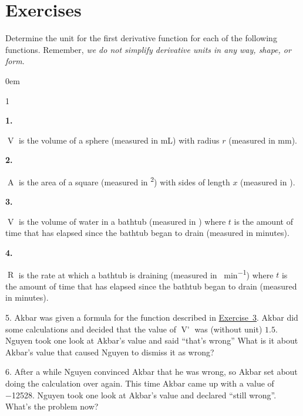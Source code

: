 \documentclass[12pt,]{book}
\theoremstyle{plain}
\theoremstyle{definition}
\numberwithin{equation}{section}
\newenvironment{exercisegroup}%
{\medskip\noindent}%
{\par\bigskip}%
\newlength{\exercisegroupindent}%
\newlength{\exercisegroupitemwidth}%
\newenvironment{exercisegrouplist}%
{\vspace{-\partopsep}%
\begin{adjustwidth}{\exercisegroupindent}{0em}}%
{\end{adjustwidth}%
\vspace{-\partopsep}%
\vspace{\baselineskip}}%
\newenvironment{exercisegroupbycol}[1]%
{\begin{exercisegrouplist}%
\vspace{-\multicolsep}%
\begin{multicols}{#1}%
\setlength{\parindent}{0em}%
\setlength{\exercisegroupitemwidth}{\linewidth}}%
{\end{multicols}%
\vspace{-\multicolsep}%
\end{exercisegrouplist}}%
\newenvironment{exercisegroupitem}[1]%
{\begin{minipage}[t]{\exercisegroupitemwidth}
\vspace{0pt}%
{\bfseries#1}%
\rule{0pt}{\baselineskip}}{\strut%
\end{minipage}%
\hspace{\columnsep}}%
\providecommand\phantomsection{}
\newcommand{\fe}[2]{\mathop{{#1}{\left(#2\right)}}}
\newcommand{\fd}[1]{#1'}
\begin{document}
\section*{Exercises}\label{exercises-22}

\begin{exercisegroup}%
Determine the unit for the first derivative function for each of the following functions. Remember, \emph{we do not simplify derivative units in any way, shape, or form}.%
\par
\begin{exercisegroupbycol}{1}%
\begin{exercisegroupitem}{1. }\phantomsection\hypertarget{exercise-194}{\null}
\(\fe{V}{r}\) is the volume of a sphere (measured in \si{\milli\liter}) with radius \(r\) (measured in \si{\milli\meter}).%
\end{exercisegroupitem}%
\par%
\begin{exercisegroupitem}{2. }\phantomsection\hypertarget{exercise-195}{\null}
\(\fe{A}{x}\) is the area of a square (measured in \si{\foot\tothe{2}}) with sides of length \(x\) (measured in \si{\foot}).%
\end{exercisegroupitem}%
\par%
\begin{exercisegroupitem}{3. }\phantomsection\hypertarget{exercise-bathtub}{\null}
\(\fe{V}{t}\) is the volume of water in a bathtub (measured in \si{\gallon}) where \(t\) is the amount of time that has elapsed since the bathtub began to drain (measured in minutes).%
\end{exercisegroupitem}%
\par%
\begin{exercisegroupitem}{4. }\phantomsection\hypertarget{exercise-bathtub-rate}{\null}
\(\fe{R}{t}\) is the rate at which a bathtub is draining (measured in \si{\gallon\per\minute}) where \(t\) is the amount of time that has elapsed since the bathtub began to drain (measured in minutes).%
\end{exercisegroupitem}%
\par%
\end{exercisegroupbycol}%
\end{exercisegroup}%
\begin{exerciselist}
\item[5.]\phantomsection\hypertarget{exercise-198}{\null}Akbar was given a formula for the function described in \hyperref[exercise-bathtub]{Exercise~3}. Akbar did some calculations and decided that the value of \(\fe{\fd{V}}{20}\) was (without unit) \(1.5\). Nguyen took one look at Akbar's value and said ``that's wrong'' What is it about Akbar's value that caused Nguyen to dismiss it as wrong?%
\par\smallskip
\item[6.]\phantomsection\hypertarget{exercise-199}{\null}After a while Nguyen convinced Akbar that he was wrong, so Akbar set about doing the calculation over again. This time Akbar came up with a value of \num{-12528}. Nguyen took one look at Akbar's value and declared ``still wrong''. What's the problem now?%
\par\smallskip
\end{exerciselist}
\end{document}
